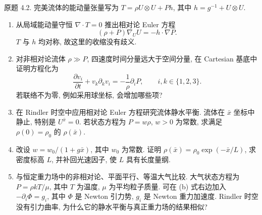 \begin{exercise}
原题 4.2. 完美流体的能动量张量写为 $T=\rho U\otimes U+Ph$, 其中 $h=g^{-1}+U\otimes U$.
\begin{enumerate}[label=(\alph*)]
\item 从局域能动量守恒 $\nabla\cdot T=0$ 推出相对论 Euler 方程
\[
(\rho+P)\nabla_UU=-h\cdot\nabla P.
\]
$T$ 与 $h$ 均对称, 故这里的收缩没有歧义.
\item 对非相对论流体 $\rho\gg P$, 四速度时间分量远大于空间分量, 在 Cartesian 基底中证明方程化为
\[
\frac{\partial v_i}{\partial t}+v_k\partial_kv_i=-\frac1\rho\partial_iP,
\qquad i,k\in\{1,2,3\}.
\]
若联络不为零, 例如采用球坐标, 会增加哪些项?
\item 在 Rindler 时空中应用相对论 Euler 方程研究流体静水平衡. 流体在 $\bar x$ 坐标中静止, 特别是 $U^{\bar x}=0$. 若状态方程为 $P=w\rho$, $w>0$ 为常数, 求满足 $\rho(0)=\rho_0$ 的 $\rho(\bar x)$.
\item 改设 $w=w_0/(1+g\bar x)$, 其中 $w_0$ 为常数. 证明 $\rho(\bar x)=\rho_0\exp(-\bar x/L)$, 求密度标高 $L$, 并补回光速因子, 使 $L$ 具有长度量纲.
\item 与恒定重力场中的非相对论、平面平行、等温大气比较. 大气状态方程为 $P=\rho kT/\mu$, 其中 $T$ 为温度, $\mu$ 为平均粒子质量. 可在 (b) 式右边加入 $-\partial_i\Phi=g_i$, 其中 $\Phi$ 是 Newton 引力势, $g_i$ 是 Newton 重力加速度. Rindler 时空没有引力曲率, 为什么它的静水平衡与真正重力场的结果相似?
\end{enumerate}
\end{exercise}
